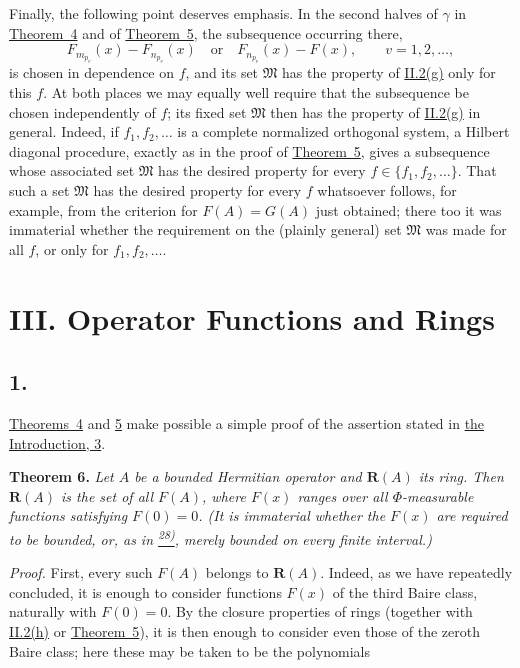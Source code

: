 \documentclass[12pt,b5paper,twoside]{article}
\newcommand{\noteref}[1]{%
  \hyperlink{note:#1}{\textsuperscript{#1)}}}
\begin{document}
Finally, the following point deserves emphasis.  In the second halves of
\hyperref[thm:4.gamma]{\(\gamma\)} in \hyperref[thm:4]{Theorem~4} and of
\hyperref[thm:5]{Theorem~5}, the subsequence occurring there,
\[
 F_{m_{p_v}}(x)-F_{n_{p_v}}(x)
 \quad\text{or}\quad
 F_{n_{p_v}}(x)-F(x),
 \qquad v=1,2,\ldots,
\]
is chosen in dependence on \(f\), and its set \(\mathfrak M\) has the
property of \hyperref[prop:II.2.g]{II.2(g)} only for this \(f\).  At both
places we may equally well require that the subsequence be chosen
independently of \(f\); its fixed set \(\mathfrak M\) then has the property
of \hyperref[prop:II.2.g]{II.2(g)} in general.  Indeed, if
\(f_1,f_2,\ldots\) is a complete normalized orthogonal system, a Hilbert
diagonal procedure, exactly as in the proof of
\hyperref[thm:5]{Theorem~5}, gives a subsequence whose associated set
\(\mathfrak M\) has the desired property for every
\(f\in\{f_1,f_2,\ldots\}\).  That such a set \(\mathfrak M\) has the
desired property for every \(f\) whatsoever follows, for example, from
the criterion for \(F(A)=G(A)\) just obtained; there too it was immaterial
whether the requirement on the (plainly general) set \(\mathfrak M\) was
made for all \(f\), or only for \(f_1,f_2,\ldots\).

\section*{III. Operator Functions and Rings}
\label{sec:III}

\subsection*{1.}\label{sec:III.1}

\hyperref[thm:4]{Theorems~4} and \hyperref[thm:5]{5} make possible a
simple proof of the assertion stated in \hyperref[sec:intro.3]{the
Introduction, 3}.

\medskip
{}\label{thm:6}\noindent\textbf{Theorem 6.}
\emph{Let \(A\) be a bounded Hermitian operator and \(\mathbf R(A)\) its
ring.  Then \(\mathbf R(A)\) is the set of all \(F(A)\), where \(F(x)\)
ranges over all \(\Phi\)-measurable functions satisfying \(F(0)=0\).
(It is immaterial whether the \(F(x)\) are required to be bounded, or, as
in \noteref{28}, merely bounded on every finite interval.)}

\noindent\textit{Proof.}
First, every such \(F(A)\) belongs to \(\mathbf R(A)\).  Indeed, as we have
repeatedly concluded, it is enough to consider functions \(F(x)\) of the
third Baire class, naturally with \(F(0)=0\).  By the closure properties
of rings (together with \hyperref[prop:II.2.h]{II.2(h)} or
\hyperref[thm:5]{Theorem~5}), it is then enough to consider even those of
the zeroth Baire class; here these may be taken to be the polynomials
\end{document}
